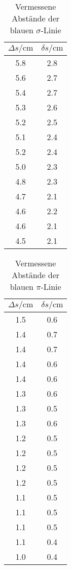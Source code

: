 \begin{table}
    \centering
    \caption{Vermessene Abstände der blauen $\sigma$-Linie}
    \label{tab:blau_sigma_Linie}
    \begin{tabular}{cc}
        \toprule
        $\Delta s/\si{\centi\meter}$ & $\delta s/\si{\centi\meter}$\\
        \midrule
        5.8 &2.8\\
        5.6 &2.7\\
        5.4 &2.7\\
        5.3 &2.6\\
        5.2 &2.5\\
        5.1 &2.4\\
        5.2 &2.4\\
        5.0 &2.3\\
        4.8 &2.3\\
        4.7 &2.1\\
        4.6 &2.2\\
        4.6 &2.1\\
        4.5 &2.1\\
        \bottomrule
    \end{tabular}
\end{table}


\begin{table}
    \centering
    \caption{Vermessene Abstände der blauen $\pi$-Linie}
    \label{tab:blau_pi_Linie}
    \begin{tabular}{cc}
        \toprule
        $\Delta s/\si{\centi\meter}$ & $\delta s/\si{\centi\meter}$\\
        \midrule
        1.5 &0.6\\
        1.4 &0.7\\
        1.4 &0.7\\
        1.4 &0.6\\
        1.4 &0.6\\
        1.3 &0.6\\
        1.3 &0.5\\
        1.3 &0.6\\
        1.2 &0.5\\
        1.2 &0.5\\
        1.2 &0.5\\
        1.2 &0.5\\
        1.1 &0.5\\
        1.1 &0.5\\
        1.1 &0.5\\
        1.1 &0.4\\
        1.0 &0.4\\
        \bottomrule
    \end{tabular}
\end{table}